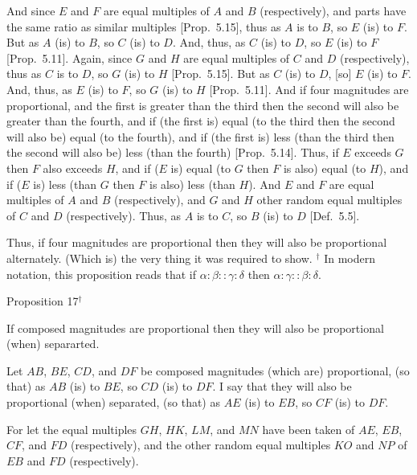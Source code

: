 And since $E$ and $F$ are equal multiples of $A$ and $B$ (respectively),
and parts  have the same ratio as similar multiples [Prop.~5.15], thus as $A$ is to $B$, so $E$ (is) to $F$.
But as $A$ (is) to $B$, so $C$ (is) to $D$. And, thus, as $C$ (is) to $D$, so
$E$ (is) to $F$ [Prop.~5.11].
Again, since $G$ and $H$ are equal multiples of $C$ and $D$ (respectively),  thus
as $C$  is to $D$, so $G$ (is) to $H$ [Prop.~5.15].
But as $C$ (is) to $D$, [so] $E$ (is) to $F$. And, thus, as $E$ (is) to $F$, so
$G$ (is) to $H$ [Prop.~5.11]. And if four magnitudes are proportional, and the first is greater than the third then
the second will also be greater than the fourth, and if (the first is) equal
(to the third then the second will also be) equal (to the fourth), and if
(the first is) less (than the third then the second will also be) less (than the fourth)
[Prop.~5.14]. Thus, if $E$ exceeds $G$ then
$F$ also exceeds $H$, and if ($E$ is) equal (to $G$ then $F$ is also) equal (to $H$), and if
($E$ is) less (than $G$ then $F$ is also) less (than $H$). And $E$ and $F$ are equal multiples of $A$ and $B$ (respectively), and $G$ and $H$ other random equal multiples
of $C$ and $D$ (respectively). Thus, as $A$ is to $C$, so $B$ (is) to $D$ [Def.~5.5].

Thus, if four magnitudes are proportional then they will
also be proportional  alternately. (Which is) the very thing it was required to show.
{\footnotesize \noindent$^\dag$ In modern notation, this proposition
reads that if $\alpha:\beta::\gamma:\delta$ then $\alpha:\gamma::\beta:\delta$.}


\begin{center}
{\large Proposition 17}$^\dag$
\end{center}

If composed  magnitudes are proportional then they will also be proportional (when)
separarted.

\epsfysize=1in
\centerline{}

Let $AB$, $BE$, $CD$, and $DF$ be composed magnitudes (which are) proportional,
(so that) as $AB$ (is) to $BE$, so $CD$ (is) to $DF$. I say that they will also be
proportional (when) separated, (so that) as $AE$ (is) to $EB$, so  $CF$ (is)
to $DF$.

For let the equal multiples $GH$, $HK$, $LM$, and $MN$ have been taken of
$AE$, $EB$, $CF$, and $FD$ (respectively), and the other random equal multiples
$KO$ and $NP$ of $EB$ and $FD$ (respectively).

